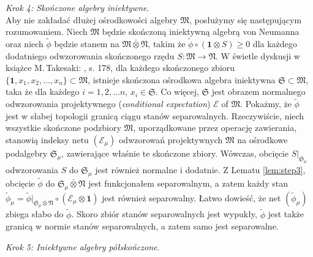 {\it Krok 4: Skończone algebry iniektywne}.\\
Aby nie zakładać dłużej ośrodkowości algebry $\mathfrak{M}$,
posłużymy się następującym rozumowaniem.
Niech $\mathfrak{M}$ będzie skończoną iniektywną algebrą von Neumanna oraz
niech $\tilde{\phi}$ będzie stanem na $\mathfrak{M} \bar{\otimes} \mathfrak{N}$,
takim że $\tilde{\phi} \circ (\mathbf{1} \otimes S) \geq 0$
dla każdego dodatniego odwzorowania skończonego rzędu
$S:\mathfrak{M} \rightarrow \mathfrak{N}$.
W świetle dyskusji w książce M.\,Takesaki: \cite{Takesaki3}, s. 178,
dla każdego skończonego zbioru
$\{ \mathbf{1}, x_{1}, x_{2}, \ldots, x_{n} \} \subset \mathfrak{M}$,
istnieje skończona ośrodkowa algebra iniektywna
$\mathfrak{S} \subset \mathfrak{M}$,
taka że dla każdego $i =1, 2, \ldots n$, $x_{i} \in \mathfrak{S}$.
Co więcej, $\mathfrak{S}$ 
jest obrazem normalnego odwzorowania projektywnego
(\emph{conditional expectation}) $\mathcal{E}$ of $\mathfrak{M}$.
Pokażmy, że $\tilde{\phi}$ jest w słabej topologii granicą ciągu stanów separowalnych.
Rzeczywiście, niech wszystkie skończone podzbiory $\mathfrak{M}$,
uporządkowane przez operację zawierania,
stanowią indeksy netu $(\mathcal{E}_{\mu})$
odwzorowań projektywnych $\mathfrak{M}$
na ośrodkowe podalgebry $\mathfrak{S}_{\mu}$,
zawierające właśnie te skończone zbiory.
Wówczas, obcięcie $S|_{\mathfrak{S}_{\mu}}$ odwzorowania $S$
do $\mathfrak{S}_{\mu}$ jest również normalne i dodatnie. 
Z Lematu \ref{lem:step3}, obcięcie $\tilde{\phi}$ do
$\mathfrak{S}_{\mu} \bar{\otimes} \mathfrak{N}$
jest funkcjonałem separowalnym, a zatem każdy stan
$\tilde{\phi}_{\mu} = \tilde{\phi}|_{\mathfrak{S}_{\mu}
\bar{\otimes} \mathfrak{N}} \circ (\mathcal{E}_{\mu} \otimes \mathbf{1})$
jest również separowalny.
Łatwo dowieść, że net $(\tilde{\phi}_{\mu})$ zbiega słabo do $\tilde{\phi}$.
Skoro zbiór stanów separowalnych jest wypukły,
$\tilde{\phi}$ jest także granicą w normie stanów separowalnych, a zatem samo
jest separowalne.

{\it Krok 5: Iniektywne algebry półskończone}.


